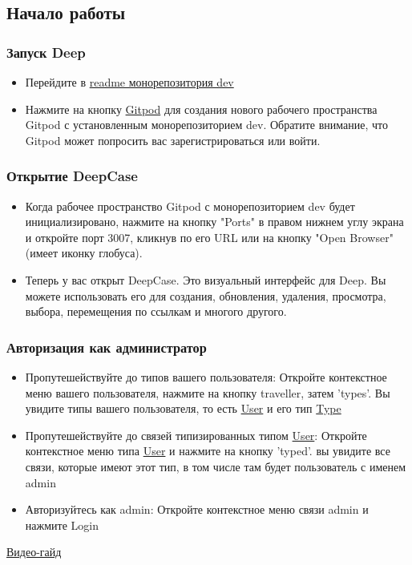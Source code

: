 \subsection{Начало работы}
\subsubsection{Запуск Deep}
\begin{itemize}
  \item Перейдите в \href{https://github.com/deep-foundation/dev?tab=readme-ov-file#readme}{readme монорепозитория dev}
  \item Нажмите на кнопку \href{https://gitpod.io/#https://github.com/deep-foundation/dev}{Gitpod} для создания нового рабочего пространства Gitpod с установленным монорепозиторием dev. Обратите внимание, что Gitpod может попросить вас зарегистрироваться или войти.
\end{itemize}



\subsubsection{Открытие DeepCase}
\begin{itemize}
  \item Когда рабочее пространство Gitpod с монорепозиторием dev будет инициализировано, нажмите на кнопку "Ports" в правом нижнем углу экрана и откройте порт 3007, кликнув по его URL или на кнопку "Open Browser" (имеет иконку глобуса).
  \item Теперь у вас открыт DeepCase. Это визуальный интерфейс для Deep. Вы можете использовать его для создания, обновления, удаления, просмотра, выбора, перемещения по ссылкам и многого другого.
\end{itemize}
\subsubsection{Авторизация как администратор}
\begin{itemize}
  \item Пропутешействуйте до типов вашего пользователя: Откройте контекстное меню вашего пользователя, нажмите на кнопку traveller, затем 'types'. Вы увидите типы вашего пользователя, то есть \hyperlink{Core.User.Description}{User} и его тип \hyperlink{Core.Type.Description}{Type}
  \item Пропутешействуйте до связей типизированных типом \hyperlink{Core.User.Description}{User}: Откройте контекстное меню типа \hyperlink{Core.User.Description}{User} и нажмите на кнопку 'typed'. вы увидите все связи, которые имеют этот тип, в том числе там будет пользователь с именем admin
  \item Авторизуйтесь как admin: Откройте контекстное меню связи admin и нажмите Login
\end{itemize}
\href{https://youtu.be/6UgOiIZMYr8}{Видео-гайд}
